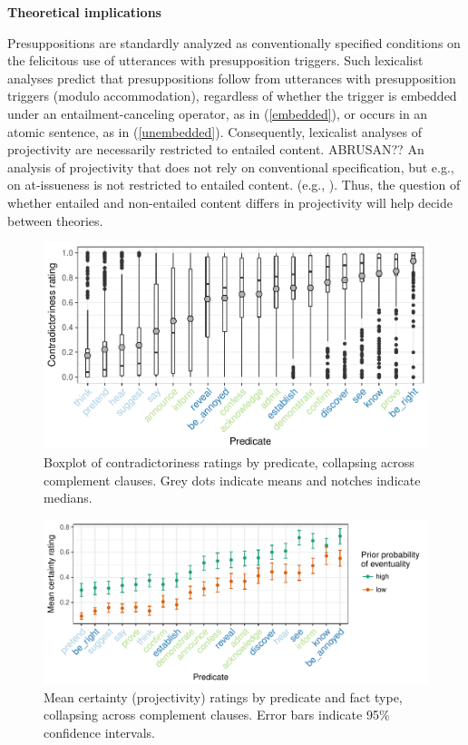 \documentclass[12pt,fleqn]{article}
\newcommand{\6}{\mbox{$[\hspace*{-.6mm}[$}}
\newcommand{\9}{\mbox{$]\hspace*{-.6mm}]$}}
\begin{document}
{\bf Theoretical implications}

Presuppositions are standardly analyzed as conventionally specified conditions on the felicitous use of utterances with presupposition triggers. Such lexicalist analyses predict that presuppositions follow from utterances with presupposition triggers (modulo accommodation), regardless of whether the trigger is embedded under an entailment-canceling operator, as in (\ref{embedded}), or occurs in an atomic sentence, as in (\ref{unembedded}). Consequently, lexicalist analyses of projectivity are necessarily restricted to entailed content. ABRUSAN?? An analysis of projectivity that does not rely on conventional specification, but e.g., on at-issueness is not restricted to entailed content. (e.g., \citealt{brst-salt10,brst-ar,abrusan2011,abrusan2013}). Thus, the question of whether entailed and non-entailed content differs in projectivity will help decide between theories. 


\newpage

\begin{figure}[h!]
\centering

\includegraphics[width=.7\paperwidth]{../results/2-veridicality2/graphs/boxplot-veridicality}

\caption{Boxplot of contradictoriness ratings by predicate, collapsing across complement clauses. Grey dots indicate means and notches indicate medians.}
\label{f-veridicality}
\end{figure}

\begin{figure}[h!]
\centering

\includegraphics[width=.8\paperwidth]{../results/3-projectivity/graphs/means-projectivity-by-predicate-and-facttype}

\caption{Mean certainty (projectivity) ratings by predicate and fact type, collapsing across complement clauses. Error bars indicate 95\% confidence intervals.}
\label{f-projectivity}
\end{figure}

\begin{scriptsize}


\end{scriptsize}
\end{document}
